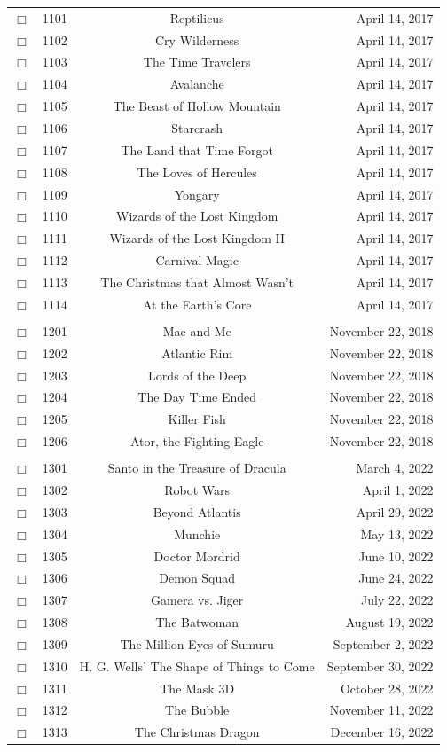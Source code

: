 \documentclass[12pt]{article}
\begin{document}
\begin{center}
\begin{longtable}[c]{cccr}
\\  %
$\Box$&1101&Reptilicus&April 14, 2017\\
$\Box$&1102&Cry Wilderness&April 14, 2017\\
$\Box$&1103&The Time Travelers&April 14, 2017\\
$\Box$&1104&Avalanche&April 14, 2017\\
$\Box$&1105&The Beast of Hollow Mountain&April 14, 2017\\
$\Box$&1106&Starcrash&April 14, 2017\\
$\Box$&1107&The Land that Time Forgot&April 14, 2017\\
$\Box$&1108&The Loves of Hercules&April 14, 2017\\
$\Box$&1109&Yongary&April 14, 2017\\
$\Box$&1110&Wizards of the Lost Kingdom&April 14, 2017\\
$\Box$&1111&Wizards of the Lost Kingdom II&April 14, 2017\\
$\Box$&1112&Carnival Magic&April 14, 2017\\
$\Box$&1113&The Christmas that Almost Wasn't&April 14, 2017\\
$\Box$&1114&At the Earth's Core&April 14, 2017\\  %

\\  %
$\Box$&1201&Mac and Me&November 22, 2018\\
$\Box$&1202&Atlantic Rim&November 22, 2018\\
$\Box$&1203&Lords of the Deep&November 22, 2018\\
$\Box$&1204&The Day Time Ended&November 22, 2018\\
$\Box$&1205&Killer Fish&November 22, 2018\\
$\Box$&1206&Ator, the Fighting Eagle&November 22, 2018\\  %

\\  %
$\Box$&1301&Santo in the Treasure of Dracula&March  4, 2022\\
$\Box$&1302&Robot Wars&April  1, 2022\\
$\Box$&1303&Beyond Atlantis&April 29, 2022\\
$\Box$&1304&Munchie&May 13, 2022\\
$\Box$&1305&Doctor Mordrid&June 10, 2022\\
$\Box$&1306&Demon Squad&June 24, 2022\\
$\Box$&1307&Gamera vs. Jiger&July 22, 2022\\
$\Box$&1308&The Batwoman&August 19, 2022\\
$\Box$&1309&The Million Eyes of Sumuru&September  2, 2022\\
$\Box$&1310&H. G. Wells' The Shape of Things to Come&September 30, 2022\\
$\Box$&1311&The Mask 3D&October 28, 2022\\
$\Box$&1312&The Bubble&November 11, 2022\\
$\Box$&1313&The Christmas Dragon&December 16, 2022\\  %


\end{longtable}
\end{center}
\end{document}
